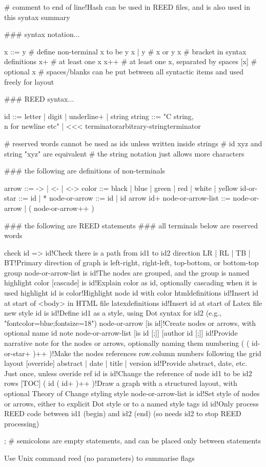 # comment to end of line!Hash can be used in REED files, and is also used in this syntax summary

### syntax notation...

x ::= y # define non-terminal x to be y
x | y   # x or y
{x}     # bracket in syntax definitions
x+      # at least one x
x++     # at least one x, separated by spaces
[x]     # optional x
        # spaces/blanks can be put between all syntactic items and used freely for layout 

### REED syntax...

id ::= {letter | digit | underline}+ | string
string ::= "C string, \\n for newline etc" | <<< terminator\n                                                        arbitrary-string\n                                                terminator

# reserved words cannot be used as ids unless written inside strings
# id xyz and string "xyz" are equivalent
# the string notation just allows more characters

### the following are definitions of non-terminals

arrow ::= -> | <- | <->
color ::= black | blue | green | red | white | yellow
id-or-star ::= id | *
node-or-arrow ::= id | id {arrow id}+
node-or-arrow-list ::= node-or-arrow | ( node-or-arrow++ )

### the following are REED statements
### all terminals below are reserved words

check id => id!Check there is a path from id1 to id2
direction {LR | RL | TB | BT}!Primary direction of graph is left-right, right-left, top-bottom, or bottom-top
group node-or-arrow-list is id!The nodes are grouped, and the group is named
highlight color [cascade] is id!Explain color as id, optionally cascading when it is used
highlight id is color!Highlight node id with color
htmldefinitions id!Insert id at start of <body> in HTML file
latexdefinitions id!Insert id at start of Latex file
new style id is id!Define id1 as a style, using Dot syntax for id2 (e.g., "fontcolor=blue;fontsize=18")
node-or-arrow [is id]!Create nodes or arrows, with optional name id
note node-or-arrow-list [is id [;]] [author id [;]] id!Provide narrative note for the nodes or arrows, optionally naming them
numbering ( {( id-or-star+ )}++ )!Make the nodes references row.column numbers following the grid layout
[override] {abstract | date | title | version} id!Provide abstract, date, etc. Just once, unless overide
ref id is id!Change the reference of node id1 to be id2
rows [TOC] ( {id ( id+ )}++ )!Draw a graph with a structured layout, with optional Theory of Change styling
style node-or-arrow-list is id!Set style of nodes or arrows, either to explicit Dot style or to a named style
tags id id!Only process REED code between id1 (begin) and id2 (end) (so needs id2 to stop REED processing)

; # semicolons are empty statements, and can be placed only between statements

Use Unix command reed (no parameters) to summarise flags











